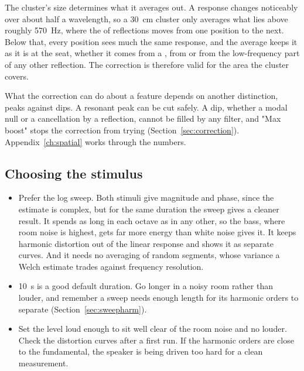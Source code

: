 \noindent The cluster's size determines what it averages out. A response changes noticeably over about half a wavelength, so a \SI{30}{\centi\metre} cluster only averages what lies above roughly \SI{570}{\hertz}, where the  of reflections moves from one position to the next. Below that, every position sees much the same response, and the average keeps it as it is at the seat, whether it comes from a , from  or from the low-frequency part of any other reflection. The correction is therefore valid for the area the cluster covers.

What the correction can do about a feature depends on another distinction, peaks against dips. A resonant peak can be cut safely. A dip, whether a modal null or a cancellation by a reflection, cannot be filled by any filter, and "Max boost" stops the correction from trying (Section~\ref{sec:correction}). Appendix~\ref{ch:spatial} works through the numbers.

\subsection{Choosing the stimulus}
\begin{itemize}[nosep]
  \item Prefer the log sweep. Both stimuli give magnitude and phase, since the  estimate is complex, but for the same duration the sweep gives a cleaner result. It spends as long in each octave as in any other, so the bass, where room noise is highest, gets far more energy than white noise gives it. It keeps harmonic distortion out of the linear response and shows it as separate curves. And it needs no averaging of random segments, whose variance a Welch estimate trades against frequency resolution.
  \item \SI{10}{\second} is a good default duration. Go longer in a noisy room rather than louder, and remember a sweep needs enough length for its harmonic orders to separate (Section~\ref{sec:sweepharm}).
  \item Set the level loud enough to sit well clear of the room noise and no louder. Check the distortion curves after a first run. If the harmonic orders are close to the fundamental, the speaker is being driven too hard for a clean measurement.
\end{itemize}
